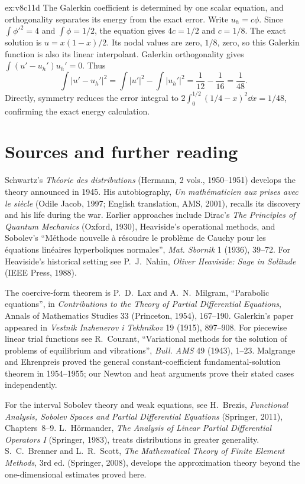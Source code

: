 \begin{solution}{ex:v8c11d}
\idea The Galerkin coefficient is determined by one scalar equation, and orthogonality separates its energy from the exact error.
\writeup Write $u_h=c\phi$. Since $\int\phi'^2=4$ and $\int\phi=1/2$, the equation gives $4c=1/2$ and $c=1/8$. The exact solution is $u=x(1-x)/2$. Its nodal values are zero, $1/8$, zero, so this Galerkin function is also its linear interpolant.
Galerkin orthogonality gives $\int(u'-u_h')u_h'=0$. Thus
\[
\int|u'-u_h'|^2=\int|u'|^2-\int|u_h'|^2
=\frac1{12}-\frac1{16}=\frac1{48}.
\]
Directly, symmetry reduces the error integral to $2\int_0^{1/2}(1/4-x)^2\dd x=1/48$, confirming the exact energy calculation.
\end{solution}

\section*{Sources and further reading}

Schwartz's \emph{Th\'eorie des distributions} (Hermann, 2 vols., 1950--1951) develops the theory announced in 1945. His autobiography, \emph{Un math\'ematicien aux prises avec le si\`ecle} (Odile Jacob, 1997; English translation, AMS, 2001), recalls its discovery and his life during the war. Earlier approaches include Dirac's \emph{The Principles of Quantum Mechanics} (Oxford, 1930), Heaviside's operational methods, and Sobolev's ``M\'ethode nouvelle \`a r\'esoudre le probl\`eme de Cauchy pour les \'equations lin\'eaires hyperboliques normales'', \emph{Mat. Sbornik} 1 (1936), 39--72. For Heaviside's historical setting see P.~J.~Nahin, \emph{Oliver Heaviside: Sage in Solitude} (IEEE Press, 1988).

The coercive-form theorem is P.~D.~Lax and A.~N.~Milgram, ``Parabolic equations'', in \emph{Contributions to the Theory of Partial Differential Equations}, Annals of Mathematics Studies 33 (Princeton, 1954), 167--190. Galerkin's paper appeared in \emph{Vestnik Inzhenerov i Tekhnikov} 19 (1915), 897--908. For piecewise linear trial functions see R.~Courant, ``Variational methods for the solution of problems of equilibrium and vibrations'', \emph{Bull. AMS} 49 (1943), 1--23. Malgrange and Ehrenpreis proved the general constant-coefficient fundamental-solution theorem in 1954--1955; our Newton and heat arguments prove their stated cases independently.

For the interval Sobolev theory and weak equations, see H.~Brezis, \emph{Functional Analysis, Sobolev Spaces and Partial Differential Equations} (Springer, 2011), Chapters~8--9. L.~H\"ormander, \emph{The Analysis of Linear Partial Differential Operators I} (Springer, 1983), treats distributions in greater generality. S.~C.~Brenner and L.~R.~Scott, \emph{The Mathematical Theory of Finite Element Methods}, 3rd ed. (Springer, 2008), develops the approximation theory beyond the one-dimensional estimates proved here.
